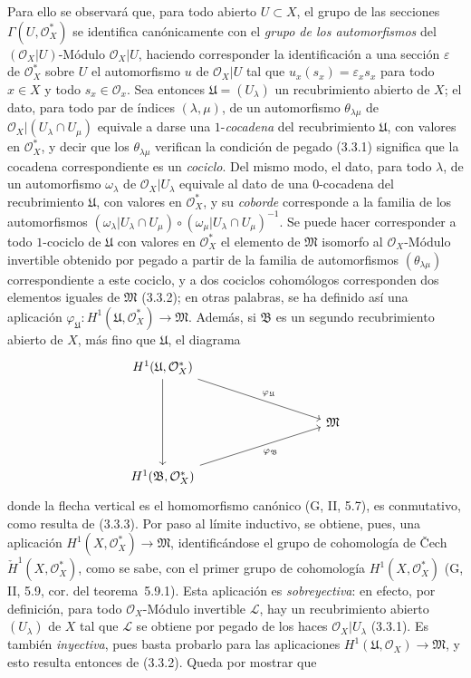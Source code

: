 \begin{env}[5.4.7]
Para ello se observará que, para todo abierto $U\subset X$, el grupo de las secciones
$\Gamma(U,\mathcal{O}_X^*)$ se identifica canónicamente con el \emph{grupo de los
automorfismos} del $(\mathcal{O}_X|U)$-Módulo $\mathcal{O}_X|U$,
haciendo corresponder la identificación a una sección $\varepsilon$ de
$\mathcal{O}_X^*$ sobre $U$ el automorfismo $u$ de $\mathcal{O}_X|U$
tal que $u_x(s_x)=\varepsilon_xs_x$ para todo $x\in X$ y todo
$s_x\in\mathcal{O}_x$. Sea entonces $\mathfrak{U}=(U_\lambda)$ un recubrimiento
abierto de $X$; el dato, para todo par de índices $(\lambda,\mu)$, de un
automorfismo $\theta_{\lambda\mu}$ de
$\mathcal{O}_X|(U_\lambda\cap U_\mu)$ equivale a darse una
$1$-\emph{cocadena} del recubrimiento $\mathfrak{U}$, con valores en
$\mathcal{O}_X^*$, y decir que los $\theta_{\lambda\mu}$ verifican la
condición de pegado (3.3.1) significa que la cocadena correspondiente es
un \emph{cociclo}. Del mismo modo, el dato, para todo $\lambda$, de un automorfismo
$\omega_\lambda$ de $\mathcal{O}_X|U_\lambda$ equivale al dato de una
$0$-cocadena del recubrimiento $\mathfrak{U}$, con valores en
$\mathcal{O}_X^*$, y su \emph{coborde} corresponde a la familia de los
automorfismos
$(\omega_\lambda|U_\lambda\cap U_\mu)\circ
 (\omega_\mu|U_\lambda\cap U_\mu)^{-1}$.
Se puede hacer corresponder a todo $1$-cociclo de $\mathfrak{U}$ con valores
en $\mathcal{O}_X^*$ el elemento de $\mathfrak{M}$ isomorfo al
$\mathcal{O}_X$-Módulo invertible obtenido por pegado a partir de la
familia de automorfismos $(\theta_{\lambda\mu})$ correspondiente a este cociclo,
y a dos cociclos cohomólogos corresponden dos elementos iguales de
$\mathfrak{M}$ (3.3.2); en otras palabras, se ha definido así una aplicación
$\varphi_{\mathfrak{U}}:H^1(\mathfrak{U},\mathcal{O}_X^*)\to\mathfrak{M}$.
Además, si $\mathfrak{B}$ es un segundo recubrimiento abierto de $X$, más fino
que $\mathfrak{U}$, el diagrama
\[
\begin{tikzcd}[column sep=huge,row sep=large]
H^1(\mathfrak{U},\mathcal{O}_X^*)
  \arrow[dd]
  \arrow[rrd,"\varphi_{\mathfrak{U}}"] & & \\
& & \mathfrak{M} \\
H^1(\mathfrak{B},\mathcal{O}_X^*)
  \arrow[rru,swap,"\varphi_{\mathfrak{B}}"] & &
\end{tikzcd}
\]
donde la flecha vertical es el homomorfismo canónico (G, II, 5.7), es
conmutativo, como resulta de (3.3.3). Por paso al límite inductivo, se
obtiene, pues, una aplicación
$H^1(X,\mathcal{O}_X^*)\to\mathfrak{M}$, identificándose el grupo de cohomología de \v{C}ech
$\check{H}^1(X,\mathcal{O}_X^*)$, como se sabe, con el primer grupo
de cohomología $H^1(X,\mathcal{O}_X^*)$ (G, II, 5.9, cor. del teorema~5.9.1).
Esta aplicación es \emph{sobreyectiva}: en efecto, por definición, para todo
$\mathcal{O}_X$-Módulo invertible $\mathcal{L}$, hay un recubrimiento abierto
$(U_\lambda)$ de $X$ tal que $\mathcal{L}$ se obtiene por pegado de los
haces $\mathcal{O}_X|U_\lambda$ (3.3.1). Es también
\emph{inyectiva}, pues basta probarlo para las aplicaciones
$H^1(\mathfrak{U},\mathcal{O}_X)\to\mathfrak{M}$, y esto resulta entonces de
(3.3.2). Queda por mostrar que


\end{env}
